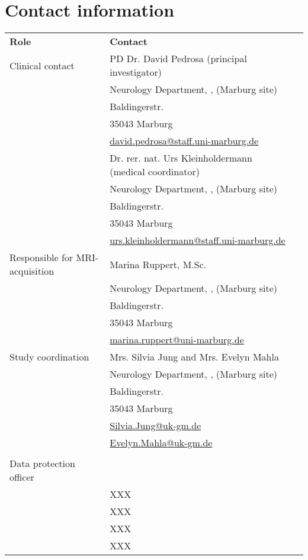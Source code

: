 \section{Contact information}
\begin{tabularx}{0.85\textwidth}{@{}lp{9cm} *{1}{l} @{}}
\toprule
\textbf{Role} & \textbf{Contact} \\
\cmidrule{1-2}
Clinical contact 	& PD Dr. David Pedrosa (principal investigator) \\
			& Neurology Department, \UKGM, (Marburg site)\\
			& Baldingerstr.\\
			& 35043 Marburg\\
			& \href{mailto:david.pedrosa@staff.uni-marburg.de}{david.pedrosa@staff.uni-marburg.de}\\
\cmidrule{2-3}
			& Dr. rer. nat. Urs Kleinholdermann (medical coordinator) \\
			& Neurology Department, \UKGM, (Marburg site)\\
			& Baldingerstr.\\
			& 35043 Marburg\\
			& \href{mailto:urs.kleinholdermann@staff.uni-marburg.de}{urs.kleinholdermann@staff.uni-marburg.de}\\

\cmidrule{1-2}
Responsible for \ac{MRI}-acquisition & Marina Ruppert, M.Sc.\\
			& Neurology Department, \UKGM, (Marburg site)\\
			& Baldingerstr.\\
			& 35043 Marburg\\
			& \href{mailto:marina.ruppert@uni-marburg.de}{marina.ruppert@uni-marburg.de}\\
\cmidrule{1-2}
Study coordination & Mrs. Silvia Jung and Mrs. Evelyn Mahla\\
			& Neurology Department, \UKGM, (Marburg site)\\
			& Baldingerstr.\\
			& 35043 Marburg\\
			& \href{mailto:Silvia.Jung@uk-gm.de}{Silvia.Jung@uk-gm.de}\\
			& \href{mailto:Evelyn.Mahla@uk-gm.de}{Evelyn.Mahla@uk-gm.de}\\
	\\

\cmidrule{1-2}
Data protection officer & \\
			& XXX\\
			& XXX\\
			& XXX\\
			& XXX\\
\bottomrule
\end{tabularx}
\newpage

